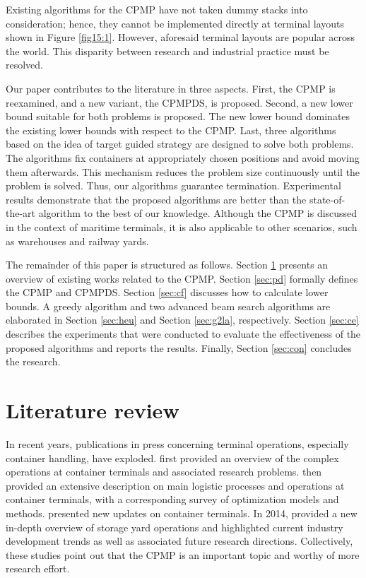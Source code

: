 \documentclass[review,3p,times,authoryear,12pt]{elsarticle}
\begin{document}
Existing algorithms for the CPMP have not taken dummy stacks into consideration; hence, they cannot be implemented directly at terminal layouts shown in Figure \ref{fig15:1}. 
However, aforesaid terminal layouts are popular across the world. 
This disparity between research and industrial practice must be resolved.

Our paper contributes to the literature in three aspects. 
First, the CPMP is reexamined, and a new variant, the CPMPDS, is proposed. 
Second, a new lower bound suitable for both problems is proposed. 
The new lower bound dominates the existing lower bounds with respect to the CPMP. 
Last, three algorithms based on the idea of target guided strategy are designed to solve both problems.
The algorithms fix containers at appropriately chosen positions and avoid moving them afterwards. 
This mechanism reduces the problem size continuously until the problem is solved. 
Thus, our algorithms guarantee termination. 
Experimental results demonstrate that the proposed algorithms are better than the state-of-the-art algorithm to the best of our knowledge. 
Although the CPMP is discussed in the context of maritime terminals, it is also applicable to other scenarios, such as warehouses and railway yards.

The remainder of this paper is structured as follows. 
Section \ref{sec:litreview} presents an overview of existing works related to the CPMP. 
Section \ref{sec:pd} formally defines the CPMP and CPMPDS. 
Section \ref{sec:cf} discusses how to calculate lower bounds. 
A greedy algorithm and two advanced beam search algorithms are elaborated in Section \ref{sec:heu} and Section \ref{sec:g2la}, respectively. 
Section \ref{sec:ce} describes the experiments that were conducted to evaluate the effectiveness of the proposed algorithms and reports the results.
Finally, Section \ref{sec:con} concludes the research.

\section{Literature review}
\label{sec:litreview}

In recent years, publications in press concerning terminal operations, especially container handling, have exploded. 
\cite{Vis2003} first provided an overview of the complex operations at container terminals and associated research problems.
\cite{Steenken2004} then provided an extensive description on main logistic processes and operations at container terminals, with a corresponding survey of optimization models and methods. 
\cite{Stahlbock2008} presented new updates on container terminals.
In 2014, \cite{Carlo2014} provided a new in-depth overview of storage yard operations and highlighted current industry development trends as well as associated future research directions.
Collectively, these studies point out that the CPMP is an important topic and worthy of more research effort.
\end{document}

